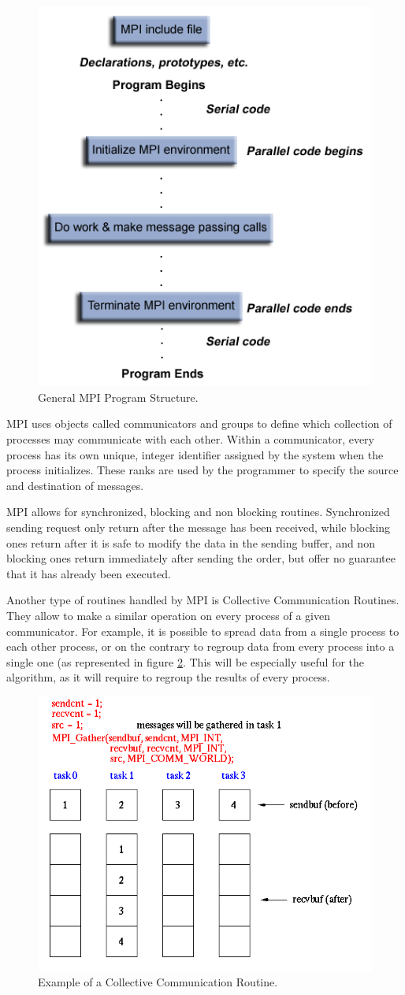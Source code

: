 \begin{figure}[H]
\centering
\includegraphics[width=.5\textwidth]{Parallelisation/Cluster/Img/prog_structure.png}
\caption{General MPI Program Structure. \cite{mpi_tuto}}
\label{fig:mpi_struct}
\end{figure}

MPI uses objects called communicators and groups to define which collection of processes may communicate with each other.
Within a communicator, every process has its own unique, integer identifier assigned by the system when the process initializes.
These ranks are used by the programmer to specify the source and destination of messages.

MPI allows for synchronized, blocking and non blocking routines.
Synchronized sending request only return after the message has been received, while blocking ones return after it is safe to modify the data in the sending buffer, and non blocking ones return immediately after sending the order, but offer no guarantee that it has already been executed.

Another type of routines handled by MPI is Collective Communication Routines.
They allow to make a similar operation on every process of a given communicator.
For example, it is possible to spread data from a single process to each other process, or on the contrary to regroup data from every process into a single one (as represented in figure \ref{fig:mpi_ccr}.
This will be especially useful for the algorithm, as it will require to regroup the results of every process.

\begin{figure}[H]
\centering
\includegraphics[width=.6\textwidth]{Parallelisation/Cluster/Img/MPI_Gather.png}
\caption{Example of a Collective Communication Routine. \cite{mpi_tuto}}
\label{fig:mpi_ccr}
\end{figure}